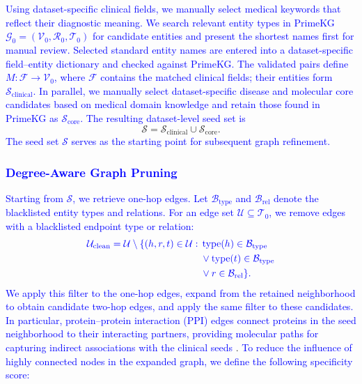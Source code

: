 \documentclass[lettersize,journal]{IEEEtran}
\begin{document}
     \textcolor{blue}{Using dataset-specific clinical fields, we manually select medical keywords that reflect their diagnostic meaning. We search relevant entity types in PrimeKG $\mathcal{G}_0=(\mathcal{V}_0,\mathcal{R}_0,\mathcal{T}_0)$ for candidate entities and present the shortest names first for manual review. Selected standard entity names are entered into a dataset-specific field--entity dictionary and checked against PrimeKG. The validated pairs define $M:\mathcal{F}\rightarrow\mathcal{V}_0$, where $\mathcal{F}$ contains the matched clinical fields; their entities form $\mathcal{S}_{\mathrm{clinical}}$. In parallel, we manually select dataset-specific disease and molecular core candidates based on medical domain knowledge and retain those found in PrimeKG as $\mathcal{S}_{\mathrm{core}}$. The resulting dataset-level seed set is}
     \begin{equation}
     \mathcal{S}
     =
     \mathcal{S}_{\mathrm{clinical}}
     \cup
     \mathcal{S}_{\mathrm{core}}.
     \label{eq:seed_set}
     \end{equation}
     \textcolor{blue}{The seed set $\mathcal{S}$ serves as the starting point for subsequent graph refinement.}

\subsubsection{\textcolor{blue}{Degree-Aware Graph Pruning}}

    \textcolor{blue}{Starting from $\mathcal{S}$, we retrieve one-hop edges. Let $\mathcal{B}_{\mathrm{type}}$ and $\mathcal{B}_{\mathrm{rel}}$ denote the blacklisted entity types and relations. For an edge set $\mathcal{U}\subseteq\mathcal{T}_0$, we remove edges with a blacklisted endpoint type or relation:}
    \begin{equation}
        {\color{blue}
        \begin{aligned}
        \mathcal{U}_{\mathrm{clean}}=\mathcal{U}\setminus\{(h,r,t)\in\mathcal{U}:\;&
        \operatorname{type}(h)\in\mathcal{B}_{\mathrm{type}}\\
        &\lor\operatorname{type}(t)\in\mathcal{B}_{\mathrm{type}}\\
        &\lor r\in\mathcal{B}_{\mathrm{rel}}\}.
        \end{aligned}
        }
        \label{eq:blacklist_filter}
    \end{equation}
    \textcolor{blue}{We apply this filter to the one-hop edges, expand from the retained neighborhood to obtain candidate two-hop edges, and apply the same filter to these candidates. In particular, protein--protein interaction (PPI) edges connect proteins in the seed neighborhood to their interacting partners, providing molecular paths for capturing indirect associations with the clinical seeds} \cite{barabasi2011network,cheng2019network}. \textcolor{blue}{To reduce the influence of highly connected nodes in the expanded graph, we define the following specificity score:}
\end{document}
